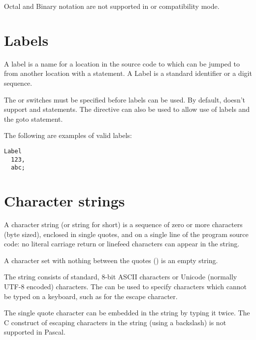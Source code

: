 \begin{remark}
Octal and Binary notation are not supported in  or  
compatibility mode.
\end{remark}

\section{Labels}
 
A label is a name for a location in the source code to which can be 
jumped to from another location with a  statement. A Label is a
standard identifier or a digit sequence.

\begin{remark}
The  or  switches must be specified before 
labels can be used. By default, \fpc doesn't support  and 
 statements. The  directive can also be used
to allow use of labels and the goto statement.
\end{remark}
The following are examples of valid labels:
\begin{verbatim}
Label
  123,
  abc;
\end{verbatim}
\section{Character strings}
A character string (or string for short) is a sequence of zero or more
characters (byte sized), enclosed in single quotes, and on a single 
line of the program source code: no literal carriage return or linefeed 
characters can appear in the string.

A character set with nothing between the quotes () is an empty string.

The string consists of standard, 8-bit ASCII characters or Unicode (normally
UTF-8 encoded) characters. The  can be used to specify 
characters which cannot be typed on a keyboard, such as  for 
the escape character. 

The single quote character can be embedded in the string by typing it twice. 
The C construct of escaping characters in the string (using a backslash) 
is not supported in Pascal.

